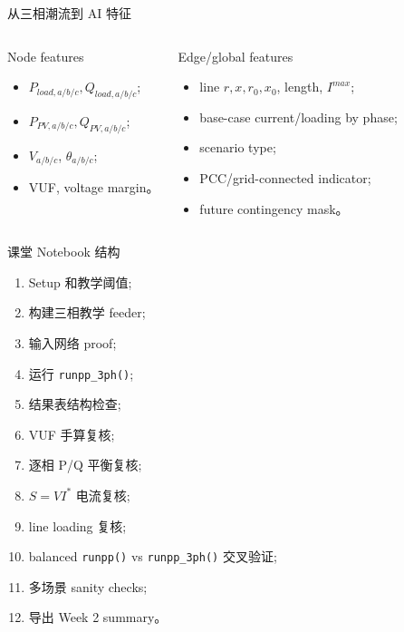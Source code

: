 \documentclass[aspectratio=169,10pt]{ctexbeamer}
\newcommand{\code}[1]{\texttt{#1}}
\begin{document}
\begin{frame}{从三相潮流到 AI 特征}
\begin{columns}[T]
\begin{block}{Node features}
\begin{itemize}
  \item $P_{load,a/b/c}, Q_{load,a/b/c}$;
  \item $P_{PV,a/b/c}, Q_{PV,a/b/c}$;
  \item $V_{a/b/c}$, $\theta_{a/b/c}$;
  \item VUF, voltage margin。
\end{itemize}
\end{block}
\begin{block}{Edge/global features}
\begin{itemize}
  \item line $r,x,r_0,x_0$, length, $I^{max}$;
  \item base-case current/loading by phase;
  \item scenario type;
  \item PCC/grid-connected indicator;
  \item future contingency mask。
\end{itemize}
\end{block}
\end{columns}
\end{frame}

\begin{frame}{课堂 Notebook 结构}
\begin{enumerate}
  \item Setup 和教学阈值;
  \item 构建三相教学 feeder;
  \item 输入网络 proof;
  \item 运行 \code{runpp\_3ph()};
  \item 结果表结构检查;
  \item VUF 手算复核;
  \item 逐相 P/Q 平衡复核;
  \item $S=VI^*$ 电流复核;
  \item line loading 复核;
  \item balanced \code{runpp()} vs \code{runpp\_3ph()} 交叉验证;
  \item 多场景 sanity checks;
  \item 导出 Week 2 summary。
\end{enumerate}
\end{frame}
\end{document}
